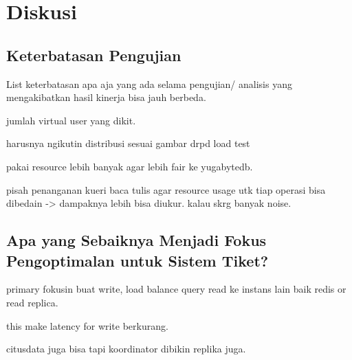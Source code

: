 \section{Diskusi}

\subsection{Keterbatasan Pengujian}

List keterbatasan apa aja yang ada selama pengujian/ analisis yang mengakibatkan hasil kinerja bisa jauh berbeda.

jumlah virtual user yang dikit.

harusnya ngikutin distribusi sesuai gambar drpd load test

pakai resource lebih banyak agar lebih fair ke yugabytedb.

pisah penanganan kueri baca tulis agar resource usage utk tiap operasi bisa dibedain -> dampaknya lebih bisa diukur. kalau skrg banyak noise.

\subsection{Apa yang Sebaiknya Menjadi Fokus Pengoptimalan untuk Sistem Tiket?}

primary fokusin buat write, load balance query read ke instans lain baik redis or read replica.

this make latency for write berkurang.

citusdata juga bisa tapi koordinator dibikin replika juga.
